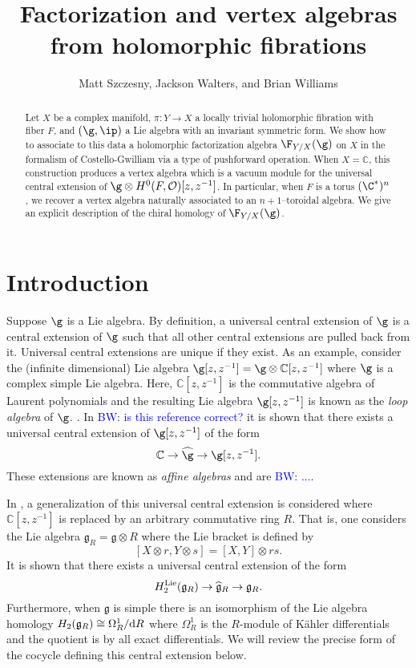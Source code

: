 \documentclass[12pt]{amsart}
\theoremstyle{definition}
\theoremstyle{remark}
\newcommand{\mc}{\mathcal}
\def\d{{\rm d}}
\def\tensor{\otimes}
\def\Hat{\widehat}
\def\fg{\mathfrak{g}}
\def\brian{\textcolor{blue}{BW: }\textcolor{blue}}
\begin{document}
 \title{Factorization and vertex algebras from  holomorphic fibrations}
  \author{Matt Szczesny, Jackson Walters, and Brian Williams}
  \date{}

  
  \maketitle

\begin{abstract}
Let $X$ be a complex manifold, $\pi: Y \rightarrow X$ a locally trivial holomorphic fibration with fiber $F$, and $(\g, \ip )$ a Lie algebra with an invariant symmetric form. We show how to associate to this data a holomorphic factorization algebra  $\F_{Y/X}(\g)$ on $X$ in the formalism of Costello-Gwilliam via a type of pushforward operation. When $X=\mathbb{C}$, this construction produces a vertex algebra which is a vacuum module for the universal central extension of $\g \otimes H^{0}(F, \mc{O})[z,z^{-1}]$. In particular,  when $F$ is a torus $(\C^{*})^n$, we recover a vertex algebra naturally associated to an $n+1$--toroidal algebra. We give an explicit description of the chiral homology of $\F_{Y/X}(\g)$.
\end{abstract}


\tableofcontents


\section{Introduction}

Suppose $\g$ is a Lie algebra. 
By definition, a universal central extension of $\g$ is a central extension of $\g$ such that all other central extensions are pulled back from it. 
Universal central extensions are unique if they exist. 
As an example, consider the (infinite dimensional) Lie algebra $\g[z,z^{-1}] = \g \tensor \mathbb{C}[z,z^{-1}]$ where $\g$ is a complex simple Lie algebra. 
Here, $\mathbb{C}[z,z^{-1}]$ is the commutative algebra of Laurent polynomials and the resulting Lie algebra $\g[z,z^{-1}]$ is known as the {\em loop algebra} of $\g$. . 
In \cite{Garland} \brian{is this reference correct?} it is shown that there exists a universal central extension of $\g[z,z^{-1}]$ of the form
\[
\mathbb{C} \to \Hat{\g} \to \g[z,z^{-1}] .
\]
These extensions are known as {\em affine algebras} and are \brian{...}.

In \cite{Kassel}, a generalization of this universal central extension is considered where $\mathbb{C}[z,z^{-1}]$ is replaced by an arbitrary commutative ring $R$. 
That is, one considers the Lie algebra $\fg_R = \fg \tensor R$ where the Lie bracket is defined by 
\[
[X \tensor r, Y \tensor s] = [X,Y] \tensor rs .
\]
It is shown that there exists a universal central extension of the form
\[
H_2^{\rm Lie}(\fg_R) \to \Hat{\fg}_R \to \fg_R .
\]
Furthermore, when $\fg$ is simple there is an isomorphism of the Lie algebra homology $H_2(\fg_R) \cong \Omega^1_R / \d R$ where $\Omega^1_R$ is the $R$-module of K\"{a}hler differentials and the quotient is by all exact differentials. 
We will review the precise form of the cocycle defining this central extension below. 
\end{document}
